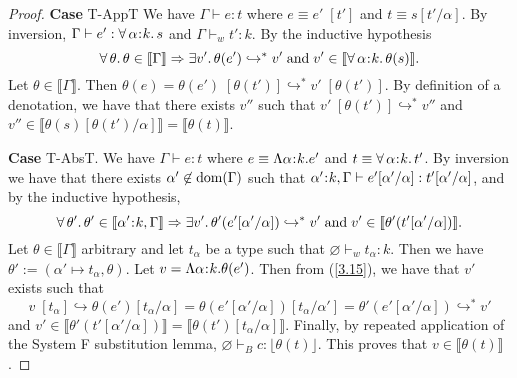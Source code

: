\documentclass[11pt]{article}
\newcommand{\al}{\alpha}
\newcommand{\bind}{\hspace{0.05em}{:}\hspace{0.05em}} %
\newcommand{\lb}{\llbracket}         %
\newcommand{\rb}{\rrbracket}         %
\newcommand{\step}{\hookrightarrow}
\newcommand{\many}{\hookrightarrow^*}
\newcommand{\polytype}[3]{\forall\, #1\bind #2.\, #3}
\newcommand{\dom}[1]{{\rm dom}(#1)}
\begin{document}
\begin{proof}
{\bf Case} {\sc T-AppT} We have $\Gamma \vdash e : t$ where $e \equiv e'\; [t']$ and $t \equiv s[t'/\al]$. By inversion, $\Gamma \vdash e' : \polytype{\al}{k}{s}$ and $\Gamma \vdash_w t': k$. By the inductive hypothesis
\begin{equation}\label{3.16}
\forall\, \theta.\, \theta \in \lb\Gamma\rb \Rightarrow \exists v'.\, \theta(e') \many v' \;{\rm and}\; v' \in \lb\polytype{\al}{k}{\theta(s)}\rb.
\end{equation}
Let $\theta \in \lb\Gamma\rb$. Then $\theta(e) = \theta(e')\; [\theta(t')] \many v'\; [\theta(t')]$. By definition of a denotation, we have that there exists $v''$ such that $v'\; [\theta(t')] \many v''$ and $v'' \in \lb \theta(s)[\theta(t')/\al]\rb = \lb\theta(t)\rb$.

{\bf Case} {\sc T-AbsT}. We have $\Gamma \vdash e : t$ where $e \equiv \Lambda \al\bind k. e'$ and $t \equiv \polytype{\al}{k}{t'}$. By inversion we have that there exists $\al' \not\in\dom{\Gamma}$ such that $\al'\bind k, \Gamma \vdash e'[\al'/\al] : t'[\al'/\al]$, and by the inductive hypothesis,
\begin{equation}\label{3.15}
\forall\, \theta'.\, \theta' \in \lb\al'\bind k, \Gamma\rb \Rightarrow
\exists v'.\, \theta'(e'[\al'/\al]) \many v' \;{\rm and}\; v' \in \lb\theta'(t'[\al'/\al])\rb.
\end{equation}
Let $\theta \in \lb\Gamma\rb$ arbitrary and let $t_\al$ be a type such that $\varnothing \vdash_w t_\al : k$. Then we have $\theta' := (\al' \mapsto t_\al, \theta).$ 
Let $v = \Lambda\al\bind k.\theta(e')$.
Then from (\ref{3.15}), we have that $v'$ exists such that
\[
v\; [t_\al] \step \theta(e')[t_\al/\al] = \theta(e'[\al'/\al])[t_\al/\al'] = \theta'(e'[\al'/\al]) \many v'
\]
and $v' \in \lb\theta'(t'[\al'/\al])\rb = \lb\theta(t')[t_\al/\al]\rb.$
Finally, by repeated application of the System F substitution lemma, $\varnothing \vdash_B c : \lfloor \theta(t)\rfloor$. This proves that $v \in \lb \theta(t)\rb$.


\end{proof}
\end{document}
